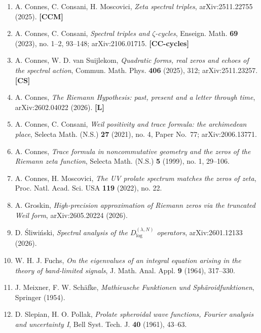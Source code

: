\documentclass[
  letterpaper,
  11pt]{article}
\providecommand{\tightlist}{%
  \setlength{\itemsep}{0pt}\setlength{\parskip}{0pt}}
\theoremstyle{plain}
\theoremstyle{definition}
\theoremstyle{remark}
\begin{document}
\begin{enumerate}
\def\labelenumi{\arabic{enumi}.}
\tightlist
\item
  A. Connes, C. Consani, H. Moscovici, \emph{Zeta spectral triples}, arXiv:2511.22755 (2025). \textbf{{[}CCM{]}}
\item
  A. Connes, C. Consani, \emph{Spectral triples and \(\zeta\)-cycles}, Enseign. Math. \textbf{69} (2023), no. 1--2, 93--148; arXiv:2106.01715. \textbf{{[}CC-cycles{]}}
\item
  A. Connes, W. D. van Suijlekom, \emph{Quadratic forms, real zeros and echoes of the spectral action}, Commun. Math. Phys. \textbf{406} (2025), 312; arXiv:2511.23257. \textbf{{[}CS{]}}
\item
  A. Connes, \emph{The Riemann Hypothesis: past, present and a letter through time}, arXiv:2602.04022 (2026). \textbf{{[}L{]}}
\item
  A. Connes, C. Consani, \emph{Weil positivity and trace formula: the archimedean place}, Selecta Math. (N.S.) \textbf{27} (2021), no. 4, Paper No.~77; arXiv:2006.13771.
\item
  A. Connes, \emph{Trace formula in noncommutative geometry and the zeros of the Riemann zeta function}, Selecta Math. (N.S.) \textbf{5} (1999), no. 1, 29--106.
\item
  A. Connes, H. Moscovici, \emph{The UV prolate spectrum matches the zeros of zeta}, Proc. Natl. Acad. Sci. USA \textbf{119} (2022), no. 22.
\item
  A. Groskin, \emph{High-precision approximation of Riemann zeros via the truncated Weil form}, arXiv:2605.20224 (2026).
\item
  D. Śliwiński, \emph{Spectral analysis of the \(D^{(\lambda,N)}_{\log}\) operators}, arXiv:2601.12133 (2026).
\item
  W. H. J. Fuchs, \emph{On the eigenvalues of an integral equation arising in the theory of band-limited signals}, J. Math. Anal. Appl. \textbf{9} (1964), 317--330.
\item
  J. Meixner, F. W. Schäfke, \emph{Mathieusche Funktionen und Sphäroidfunktionen}, Springer (1954).
\item
  D. Slepian, H. O. Pollak, \emph{Prolate spheroidal wave functions, Fourier analysis and uncertainty I}, Bell Syst. Tech. J. \textbf{40} (1961), 43--63.
\end{enumerate}
\end{document}
